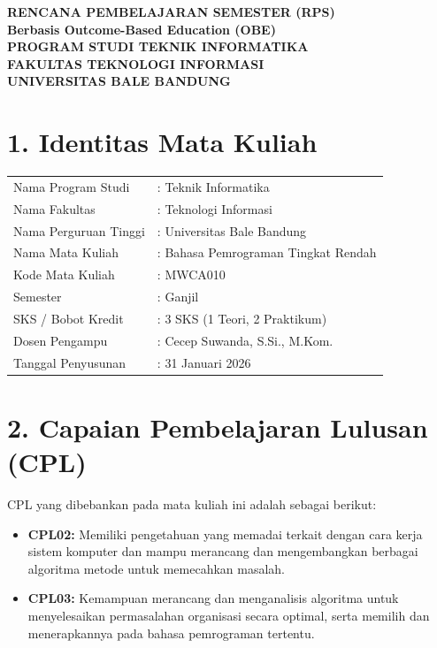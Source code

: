 \documentclass[12pt,a4paper]{article}
\begin{document}
\begin{center}
\textbf{\Large RENCANA PEMBELAJARAN SEMESTER (RPS)}\\
\textbf{Berbasis Outcome-Based Education (OBE)}\\[0.5cm]
\textbf{PROGRAM STUDI TEKNIK INFORMATIKA}\\
\textbf{FAKULTAS TEKNOLOGI INFORMASI}\\
\textbf{UNIVERSITAS BALE BANDUNG}\\
\end{center}

\vspace{1cm}

\section*{1. Identitas Mata Kuliah}
\begin{tabular}{ll}
Nama Program Studi & : Teknik Informatika \\
Nama Fakultas & : Teknologi Informasi \\
Nama Perguruan Tinggi & : Universitas Bale Bandung \\
Nama Mata Kuliah & : Bahasa Pemrograman Tingkat Rendah \\
Kode Mata Kuliah & : MWCA010 \\
Semester & : Ganjil \\
SKS / Bobot Kredit & : 3 SKS (1 Teori, 2 Praktikum) \\
Dosen Pengampu & : Cecep Suwanda, S.Si., M.Kom. \\
Tanggal Penyusunan & : 31 Januari 2026 \\
\end{tabular}

\vspace{0.5cm}

\section*{2. Capaian Pembelajaran Lulusan (CPL)}

CPL yang dibebankan pada mata kuliah ini adalah sebagai berikut:

\begin{itemize}[leftmargin=*]
  \item \textbf{CPL02:} Memiliki pengetahuan yang memadai terkait dengan cara kerja sistem komputer dan mampu merancang dan mengembangkan berbagai algoritma metode untuk memecahkan masalah.

  \item \textbf{CPL03:} Kemampuan merancang dan menganalisis algoritma untuk menyelesaikan permasalahan organisasi secara optimal, serta memilih dan menerapkannya pada bahasa pemrograman tertentu.
\end{itemize}
\end{document}
